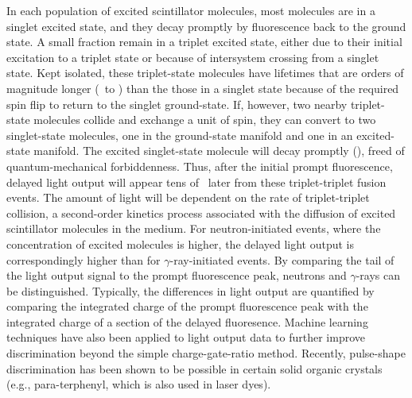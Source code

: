 In each population of excited scintillator molecules, most molecules are in a
singlet excited state, and they decay promptly by fluorescence back to the
ground state. A small fraction remain in a triplet excited state,
either due to their initial excitation to a
triplet state or because of intersystem crossing from a singlet state. Kept isolated, these
triplet-state molecules have lifetimes that are orders of magnitude longer
(\micro\second\ to \milli\second) than the those in a singlet state because of the required spin
flip to return to the singlet ground-state. If, however, two nearby triplet-state
molecules collide and exchange a unit of spin, they can convert to two singlet-state
molecules, one in the ground-state manifold and one in an excited-state manifold. The excited
singlet-state molecule will decay promptly (\nano\second), freed of quantum-mechanical forbiddenness.
Thus, after the initial prompt fluorescence, delayed light output will appear tens
of \nano\second\ later from these triplet-triplet fusion events. The amount of light will be
dependent on the rate of triplet-triplet collision, a second-order kinetics
process associated with the diffusion of excited scintillator molecules in the
medium. For neutron-initiated events, where the concentration of excited molecules is
higher, the delayed light output is correspondingly higher than for $\gamma$-ray-initiated
events. By comparing the tail of the light output signal to the prompt
fluorescence peak, neutrons and $\gamma$-rays can be distinguished. Typically, the differences in
light output are quantified by comparing the integrated charge of the prompt fluorescence peak
with the integrated charge of a section of the delayed fluoresence. Machine learning 
techniques have also been applied to light output data to further improve discrimination 
\cite{Doucet2018} beyond the simple charge-gate-ratio method. Recently, pulse-shape
discrimination has been shown to be possible in certain solid organic crystals (e.g.,
para-terphenyl, which is also used in laser dyes).

